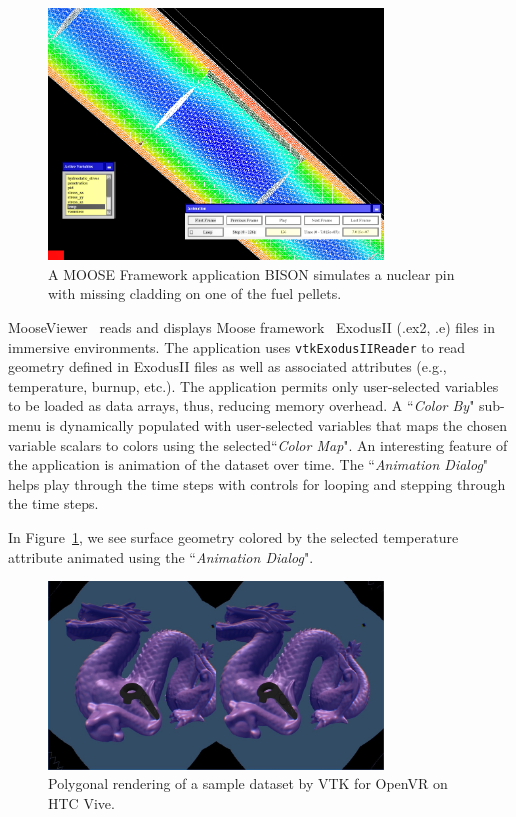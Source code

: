 \begin{figure}[h!]
 \centering
 \includegraphics[width=3.5in]{images/fuelpin.png}
 \caption{A MOOSE Framework application BISON simulates a nuclear pin with missing cladding on one of the fuel pellets.}
 \label{fig:fuelpin}
\end{figure}

MooseViewer~\cite{MooseViewer} reads and displays Moose framework~\cite{Gaston:2015, MooseFramework} ExodusII (.ex2, .e) files in immersive environments. The application uses \texttt{vtkExodusIIReader} to read geometry defined in ExodusII files as well as associated attributes (e.g., temperature, burnup, etc.). The application permits only user-selected variables to be loaded as data arrays, thus, reducing memory overhead. A ``\textit{Color By}" sub-menu is dynamically populated with user-selected variables that maps the chosen variable scalars to colors using the selected``\textit{Color Map}".
An interesting feature of the application is animation of the dataset over time.
The ``\textit{Animation Dialog}" helps play through the time steps with controls for looping and stepping through the time steps.

In Figure~\ref{fig:fuelpin}, we see surface geometry colored by the selected temperature attribute animated using the ``\textit{Animation Dialog}".

\begin{figure}[h!]
  \centering
  \includegraphics[width=3.5in]{images/Dragon.jpg}
  \caption{Polygonal rendering of a sample dataset by VTK for OpenVR on HTC Vive.}
  \label{fig:openvrdragon}
\end{figure}

